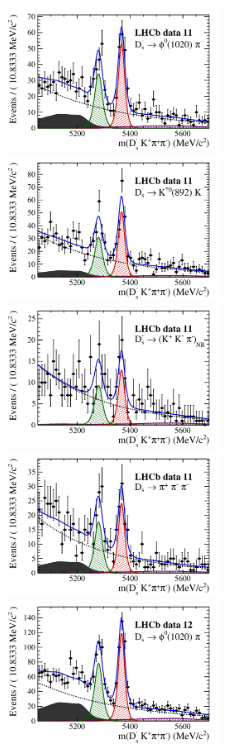 \begin{figure}[h]
\includegraphics[height=!,width=0.5\textwidth]{figs/signal_y11_phipi.pdf}
\includegraphics[height=!,width=0.5\textwidth]{figs/signal_y11_KsK.pdf}
\includegraphics[height=!,width=0.5\textwidth]{figs/signal_y11_KKpi_NR.pdf}
\includegraphics[height=!,width=0.5\textwidth]{figs/signal_y11_pipipi.pdf}
\includegraphics[height=!,width=0.5\textwidth]{figs/signal_y12_phipi.pdf}

\end{figure}
